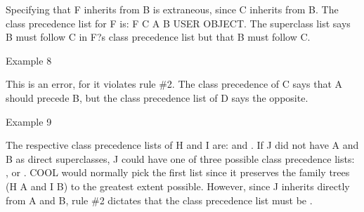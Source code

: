 \documentclass[letterpaper,10pt,english]{sphinxmanual}
\begin{document}
\begin{sphinxVerbatim}[commandchars=\\\{\}]
    
\end{sphinxVerbatim}

Specifying that F inherits from B is extraneous, since C inherits from
B. The class precedence list for F is: F C A B USER OBJECT. The
superclass list says B must follow C in F?s class precedence list but
 that B must  follow C.

Example 8

\begin{sphinxVerbatim}[commandchars=\\\{\}]
    
\end{sphinxVerbatim}

This is an error, for it violates rule \#2. The class precedence of C
says that A should precede B, but the class precedence list of D says
the opposite.

Example 9

\begin{sphinxVerbatim}[commandchars=\\\{\}]
   

   

      
\end{sphinxVerbatim}

The respective class precedence lists of H and I are: 
and . If J did not have A and B as direct superclasses, J
could have one of three possible class precedence lists: ,  or . COOL would
normally pick the first list since it preserves the family trees (H A
and I B) to the greatest extent possible. However, since J inherits
directly from A and B, rule \#2 dictates that the class precedence list
must be .
\end{document}
